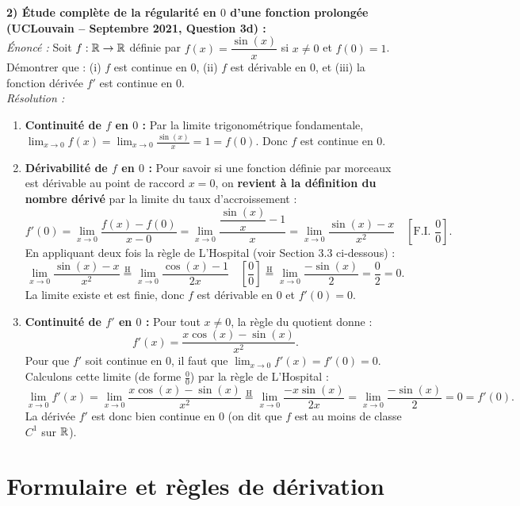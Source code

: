 \begin{exemple}
\medskip
\textbf{2) Étude complète de la régularité en $0$ d'une fonction prolongée (UCLouvain -- Septembre 2021, Question 3d) :}\\
\emph{Énoncé :} Soit $f : \mathbb{R} \to \mathbb{R}$ définie par $f(x) = \dfrac{\sin(x)}{x}$ si $x \neq 0$ et $f(0) = 1$. Démontrer que : (i) $f$ est continue en $0$, (ii) $f$ est dérivable en $0$, et (iii) la fonction dérivée $f'$ est continue en $0$.\\
\emph{Résolution :}
\begin{enumerate}[label=(\roman*)]
    \item \textbf{Continuité de $f$ en $0$ :} Par la limite trigonométrique fondamentale, $\lim_{x \to 0} f(x) = \lim_{x \to 0} \frac{\sin(x)}{x} = 1 = f(0)$. Donc $f$ est continue en $0$.
    \item \textbf{Dérivabilité de $f$ en $0$ :} Pour savoir si une fonction définie par morceaux est dérivable au point de raccord $x = 0$, on \textbf{revient à la définition du nombre dérivé} par la limite du taux d'accroissement :
    \[
        f'(0) = \lim_{x \to 0} \frac{f(x) - f(0)}{x - 0} = \lim_{x \to 0} \frac{\dfrac{\sin(x)}{x} - 1}{x} = \lim_{x \to 0} \frac{\sin(x) - x}{x^2} \quad \left[\text{F.I. } \frac{0}{0}\right].
    \]
    En appliquant deux fois la règle de L'Hospital (voir Section 3.3 ci-dessous) :
    \[
        \lim_{x \to 0} \frac{\sin(x) - x}{x^2} \stackrel{\text{H}}{=} \lim_{x \to 0} \frac{\cos(x) - 1}{2x} \quad \left[\frac{0}{0}\right] \stackrel{\text{H}}{=} \lim_{x \to 0} \frac{-\sin(x)}{2} = \frac{0}{2} = 0.
    \]
    La limite existe et est finie, donc $f$ est dérivable en $0$ et $\boxed{f'(0) = 0}$.
    \item \textbf{Continuité de $f'$ en $0$ :} Pour tout $x \neq 0$, la règle du quotient donne :
    \[
        f'(x) = \frac{x\cos(x) - \sin(x)}{x^2}.
    \]
    Pour que $f'$ soit continue en $0$, il faut que $\lim_{x \to 0} f'(x) = f'(0) = 0$. Calculons cette limite (de forme $\frac{0}{0}$) par la règle de L'Hospital :
    \[
        \lim_{x \to 0} f'(x) = \lim_{x \to 0} \frac{x\cos(x) - \sin(x)}{x^2} \stackrel{\text{H}}{=} \lim_{x \to 0} \frac{-x\sin(x)}{2x} = \lim_{x \to 0} \frac{-\sin(x)}{2} = 0 = f'(0).
    \]
    La dérivée $f'$ est donc bien continue en $0$ (on dit que $f$ est au moins de classe $C^1$ sur $\mathbb{R}$).
\end{enumerate}
\end{exemple}

\section{Formulaire et règles de dérivation}

